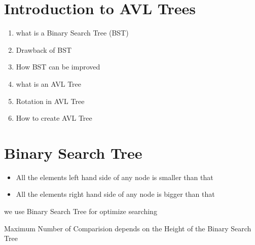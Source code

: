 \documentclass[12pt]{article}
\begin{document}
\tableofcontents

\newpage

\section{Introduction to AVL Trees}

\begin{enumerate}
	\item what is a Binary Search Tree (BST)
	\item Drawback of BST
	\item How BST can be improved
	\item what is an AVL Tree
	\item Rotation in AVL Tree
	\item How to create AVL Tree
\end{enumerate}


\section{Binary Search Tree}

\begin{center}
\end{center}


\begin{itemize}
	\item All the elements left hand side of any node is smaller than that
	\item All the elements right hand side of any node is bigger than that
\end{itemize}


\begin{tcolorbox}
we use Binary Search Tree for optimize searching
\end{tcolorbox}

\begin{tcolorbox}
Maximum Number of Comparision depends on the Height of the Binary Search Tree
\end{tcolorbox}
\end{document}
